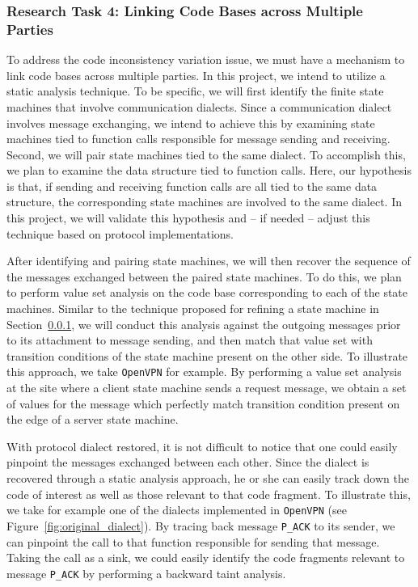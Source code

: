\subsubsection{Research Task 4: Linking Code Bases across Multiple Parties}

To address the code inconsistency variation issue, we must have a mechanism to link code bases across multiple parties. In this project, we intend to utilize a static analysis technique. To be specific, we will first identify the finite state machines that involve communication dialects. Since a communication dialect involves message exchanging, we intend to achieve this by examining state machines tied to function calls responsible for message sending and receiving. Second, we will pair state machines tied to the same dialect. To accomplish this, we plan to examine the data structure tied to function calls. Here, our hypothesis is that, if sending and receiving function calls are all tied to the same data structure, the corresponding state machines are involved to the same dialect. In this project, we will validate this hypothesis and -- if needed -- adjust this technique based on protocol implementations. 

After identifying and pairing state machines, we will then recover the sequence of the messages exchanged between the paired state machines. To do this, we plan to  perform value set analysis on the code base corresponding to each of the state machines. Similar to the technique proposed for refining a state machine in Section~\ref{}, we will conduct this analysis against the outgoing messages prior to its attachment to message sending, and then match that value set with transition conditions of the state machine present on the other side. To illustrate this approach, we take \texttt{OpenVPN} for example. By performing a value set analysis at the site where a client state machine sends a request message, we obtain a set of values for the message which perfectly match transition condition  present on the edge of a server state machine. 

With protocol dialect restored, it is not difficult to notice that one could easily pinpoint the messages exchanged between each other. Since the dialect is recovered through a static analysis approach, he or she can easily track down the code of interest as well as those relevant to that code fragment. To illustrate this, we take for example one of the dialects implemented in \texttt{OpenVPN} (see Figure~\ref{fig:original_dialect}). By tracing back message \texttt{P\_ACK} to its sender, we can pinpoint the call to that function responsible for sending that message. Taking the call as a sink, we could easily identify the code fragments relevant to message \texttt{P\_ACK} by performing a backward taint analysis.

